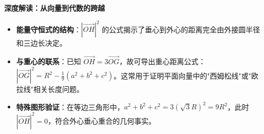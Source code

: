 \begin{explanationbox}
\textbf{深度解读：从向量到代数的跨越}
\begin{itemize}
    \item \textbf{能量守恒式的结构}：$|\vec{OH}|^2$ 的公式揭示了垂心到外心的距离完全由外接圆半径和三边长决定。
    \item \textbf{与重心的联系}：已知 $\vec{OH} = 3\vec{OG}$，故可导出重心距离公式：$|\vec{OG}|^2 = R^2 - \frac{1}{9}(a^2+b^2+c^2)$。这常用于证明平面向量中的"西姆松线"或"欧拉线"相关长度问题。
    \item \textbf{特殊图形验证}：在等边三角形中，$a^2+b^2+c^2 = 3(\sqrt{3}R)^2 = 9R^2$，此时 $|\vec{OH}|^2 = 0$，符合外心垂心重合的几何事实。
\end{itemize}
\end{explanationbox}